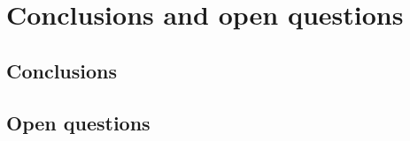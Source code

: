 \chapter{Conclusions and open questions} %
\label{Chapter6}
\section{Conclusions}
\section{Open questions} %
